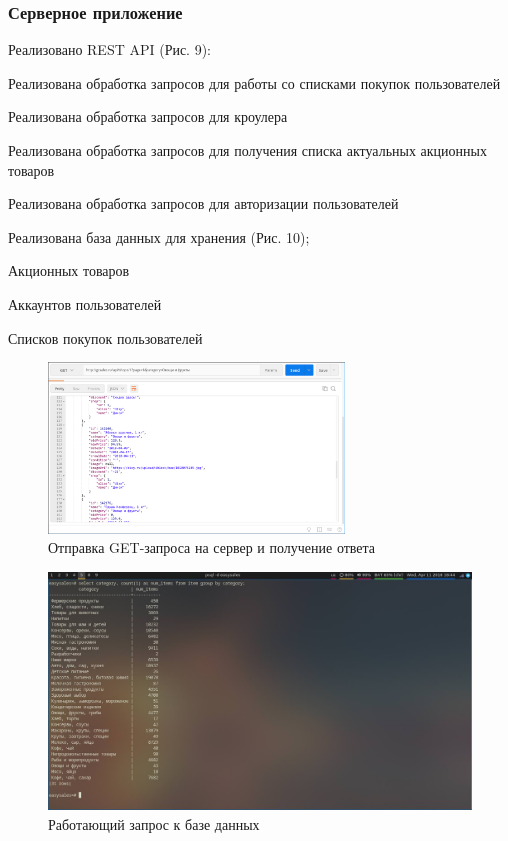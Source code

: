 \newpage
\subsubsection{Серверное приложение}
\begin{my_enumerate}
  \item Реализовано REST API (Рис. 9):
    \begin{my_enumerate}
      \item Реализована обработка запросов для работы со списками покупок
        пользователей
      \item Реализована обработка запросов для кроулера
      \item Реализована обработка запросов для получения списка актуальных
        акционных товаров
      \item Реализована обработка запросов для авторизации пользователей
    \end{my_enumerate}
  \item Реализована база данных для хранения (Рис. 10);
    \begin{my_enumerate}
      \item Акционных товаров
      \item Аккаунтов пользователей
      \item Списков покупок пользователей
    \end{my_enumerate}
\end{my_enumerate}

\begin{figure}[h!]
    \centering
    \includegraphics[width=0.7\textwidth]{./screenshots/postman.png}
    \caption{Отправка GET-запроса на сервер и получение ответа}
\end{figure}

\begin{figure}[h!]
    \centering
    \includegraphics[width=\textwidth]{./screenshots/database.jpg}
    \caption{Работающий запрос к базе данных}
\end{figure}

